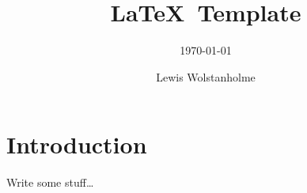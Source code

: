 

\title{\LaTeX~Template}
\subtitle{\getDate\today}
\author{Lewis Wolstanholme}

\maketitle


\section*{Introduction}

Write some stuff\ldots

\pagebreak

